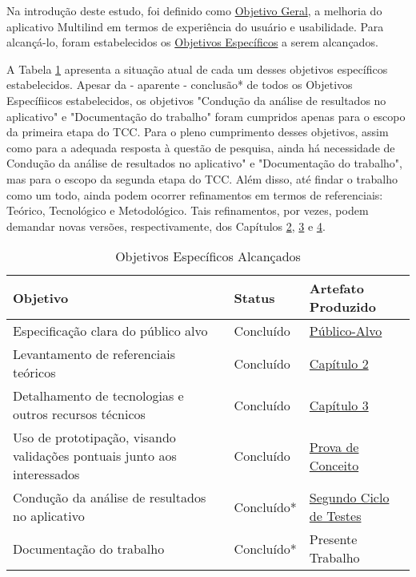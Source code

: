 Na introdução deste estudo, foi definido como \hyperref[sec:Objetivos]{Objetivo Geral}, a melhoria do aplicativo Multilind em termos de experiência do usuário e usabilidade. 
Para alcançá-lo, foram estabelecidos os \hyperref[sec:Objetivos]{Objetivos Específicos} a serem alcançados.

A Tabela \ref{tab09} apresenta a situação atual de cada um desses objetivos específicos estabelecidos. Apesar da - aparente - conclusão* de todos os Objetivos Específiicos 
estabelecidos, os objetivos "Condução da análise de resultados no aplicativo" e "Documentação do trabalho" foram cumpridos apenas para o escopo da primeira etapa do TCC. 
Para o pleno cumprimento desses objetivos, assim como para a adequada resposta à questão de pesquisa, ainda há necessidade de Condução da análise de resultados no aplicativo" 
e "Documentação do trabalho", mas para o escopo da segunda etapa do TCC. Além disso, até findar o trabalho como um todo, ainda podem ocorrer refinamentos em termos de referenciais: 
Teórico, Tecnológico e Metodológico. Tais refinamentos, por vezes, podem demandar novas versões, respectivamente, dos Capítulos \hyperref[chap:Referencial]{2}, 
\hyperref[chap:ReferencialTech]{3} e \hyperref[chap:Metodologia]{4}.

\begin{table}[h!]
	\centering
	\caption{Objetivos Específicos Alcançados}
	\label{tab09}
	\begin{tabularx}{\textwidth}{p{8cm}|p{2cm}|p{4cm}}
	\hline
    Objetivo                                                        & Status       & Artefato Produzido             \\ \hline
    Especificação clara do público alvo                                                     & Concluído    & \hyperref[Publico-Alvo]{Público-Alvo}              \\
    Levantamento de referenciais teóricos                                          & Concluído    & \hyperref[chap:Referencial]{Capítulo 2}                   \\
    Detalhamento de tecnologias e outros recursos técnicos                                       & Concluído    & \hyperref[chap:ReferencialTech]{Capítulo 3}                    \\
    Uso de prototipação, visando validações pontuais junto aos interessados                                      & Concluído    & \hyperref[sec:Prova de Conceito]{Prova de Conceito}                   \\
    Condução da análise de resultados no aplicativo                                          & Concluído*    & \hyperref[sec:Segundo Ciclo]{Segundo Ciclo de Testes}                    \\
    Documentação do trabalho                       & Concluído*    & Presente Trabalho         \\ \hline
	\end{tabularx}
\end{table}

